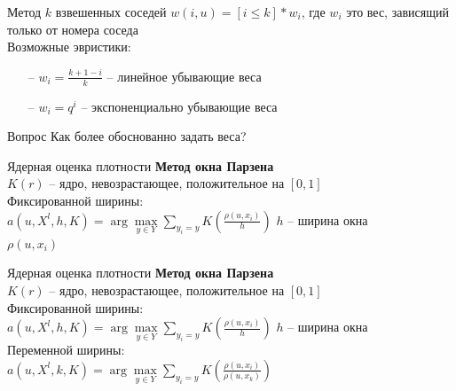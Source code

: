 \documentclass[10pt]{beamer}
\begin{document}
\begin{frame}{Метод $k$ взвешенных соседей}
	${w(i,u) = [i \leq k] * w_i}$, где $w_i$ это вес, зависящий только от номера соседа\\
	\bigbreak
	Возможные эвристики:\\
	\begin{itemize} [<+- | alert@+>]
	\item[--] ${w_i = \frac{k+1-i}{k}}$ -- линейное убывающие веса\\ %
	\item[--] ${w_i = q^i}$ -- экспоненциально убывающие веса\\
	\end{itemize}
\end{frame}

\begin{frame}{Вопрос}
	\centering
	Как более обоснованно задать веса?\\
\end{frame}

\begin{frame}{Ядерная оценка плотности}
	\textbf{Метод окна Парзена}\\
	$K(r)$ -- ядро, невозрастающее, положительное на ${[0, 1]}$\\
	\bigbreak
	Фиксированной ширины:\\
	${a(u, X^l, h, K) = \arg\max\limits_{y \in Y} \sum\limits_{y_i = y} K(\frac{\rho(u, x_i)}{h})}$ \hspace{5mm} $h$ -- ширина окна\\
	
	$\rho(u, x_i)$
\end{frame}

\begin{frame}{Ядерная оценка плотности}
	\textbf{Метод окна Парзена}\\
  $K(r)$ -- ядро, невозрастающее, положительное на ${[0, 1]}$\\
  \bigbreak
	Фиксированной ширины:\\
	${a(u, X^l, h, K) = \arg\max\limits_{y \in Y} \sum\limits_{y_i = y} K(\frac{\rho(u, x_i)}{h})}$  \hspace{5mm}  $h$ -- ширина окна\\
  \bigbreak
	Переменной ширины:\\
	${a(u, X^l, k, K) = \arg\max\limits_{y \in Y} \sum\limits_{y_i = y}  K(\frac{\rho(u, x_i)}{\rho(u, x_{k})})}$
\end{frame}
\end{document}
